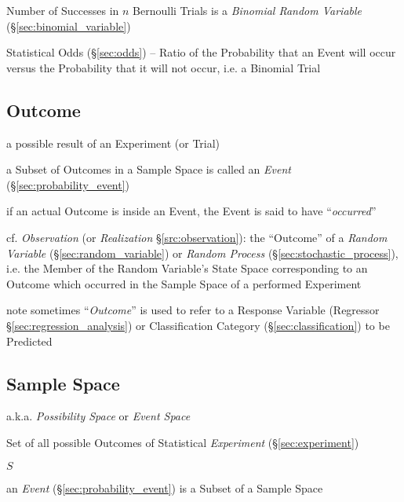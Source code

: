 Number of Successes in $n$ Bernoulli Trials is a \emph{Binomial Random
  Variable} (\S\ref{sec:binomial_variable})

\fist Statistical Odds (\S\ref{sec:odds}) -- Ratio of the Probability that an
Event will occur versus the Probability that it will not occur, i.e. a Binomial
Trial



\subsection{Outcome}\label{sec:outcome}

a possible result of an Experiment (or Trial)

a Subset of Outcomes in a Sample Space is called an \emph{Event}
(\S\ref{sec:probability_event})

if an actual Outcome is inside an Event, the Event is said to have
``\emph{occurred}''

\fist cf. \emph{Observation} (or \emph{Realization} \S\ref{src:observation}):
the ``Outcome'' of a \emph{Random Variable} (\S\ref{sec:random_variable}) or
\emph{Random Process} (\S\ref{sec:stochastic_process}), i.e. the Member of the
Random Variable's State Space corresponding to an Outcome which occurred in the
Sample Space of a performed Experiment

\fist note sometimes ``\emph{Outcome}'' is used to refer to a Response Variable
(Regressor \S\ref{sec:regression_analysis}) or Classification Category
(\S\ref{sec:classification}) to be Predicted



\subsection{Sample Space}\label{sec:sample_space}

a.k.a. \emph{Possibility Space} or \emph{Event Space}

Set of all possible Outcomes of Statistical \emph{Experiment}
(\S\ref{sec:experiment})

$S$

an \emph{Event} (\S\ref{sec:probability_event}) is a Subset of a Sample Space

